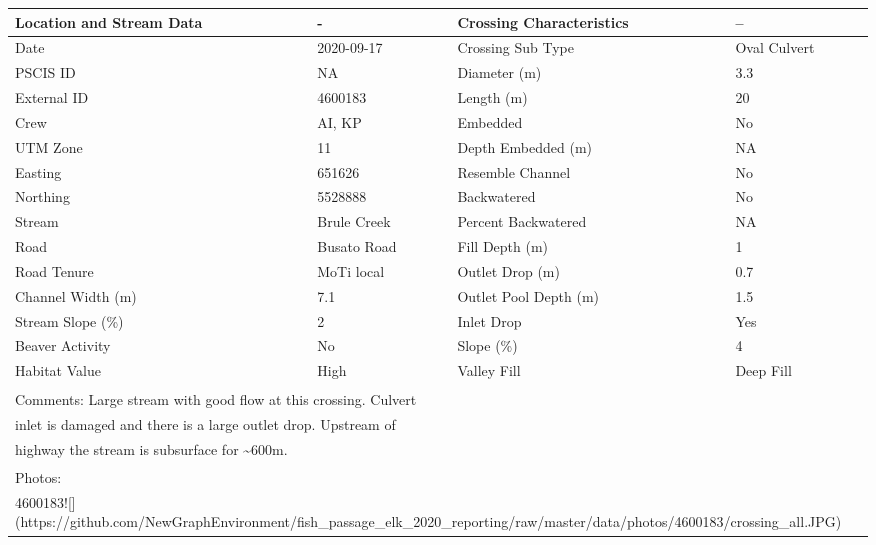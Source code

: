\documentclass[
]{book}
\begin{document}
\begin{tabular}{l|l|l|l}
\hline
Location and Stream Data & - & Crossing Characteristics & --\\
\hline
Date & 2020-09-17 & Crossing Sub Type & Oval Culvert\\
\hline
PSCIS ID & NA & Diameter (m) & 3.3\\
\hline
External ID & 4600183 & Length (m) & 20\\
\hline
Crew & AI, KP & Embedded & No\\
\hline
UTM Zone & 11 & Depth Embedded (m) & NA\\
\hline
Easting & 651626 & Resemble Channel & No\\
\hline
Northing & 5528888 & Backwatered & No\\
\hline
Stream & Brule Creek & Percent Backwatered & NA\\
\hline
Road & Busato Road & Fill Depth (m) & 1\\
\hline
Road Tenure & MoTi local & Outlet Drop (m) & 0.7\\
\hline
Channel Width (m) & 7.1 & Outlet Pool Depth (m) & 1.5\\
\hline
Stream Slope (\%) & 2 & Inlet Drop & Yes\\
\hline
Beaver Activity & No & Slope (\%) & 4\\
\hline
Habitat Value & High & Valley Fill & Deep Fill\\
\hline
\multicolumn{4}{l}{\textsuperscript{} Comments: Large stream with good flow at this crossing. Culvert}\\
\multicolumn{4}{l}{inlet is damaged and there is a large outlet drop. Upstream of}\\
\multicolumn{4}{l}{highway the stream is subsurface for \textasciitilde{}600m.}\\
\multicolumn{4}{l}{\textsuperscript{} Photos:}\\
\multicolumn{4}{l}{4600183![](https://github.com/NewGraphEnvironment/fish\_passage\_elk\_2020\_reporting/raw/master/data/photos/4600183/crossing\_all.JPG)}\\
\end{tabular}
\end{document}
